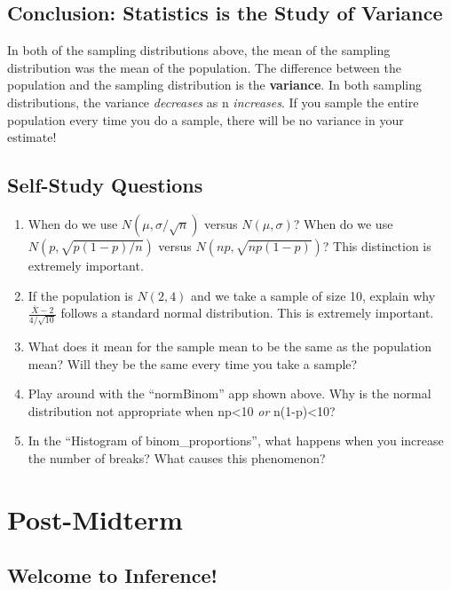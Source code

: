 \documentclass[
  letterpaper,
  DIV=11,
  numbers=noendperiod]{scrreprt}
\providecommand{\tightlist}{%
  \setlength{\itemsep}{0pt}\setlength{\parskip}{0pt}}\usepackage{longtable,booktabs,array}
\begin{document}
\hypertarget{conclusion-statistics-is-the-study-of-variance}{%
\chapter{Conclusion: Statistics is the Study of
Variance}\label{conclusion-statistics-is-the-study-of-variance}}

In both of the sampling distributions above, the mean of the sampling
distribution was the mean of the population. The difference between the
population and the sampling distribution is the \textbf{variance}. In
both sampling distributions, the variance \emph{decreases} as n
\emph{increases}. If you sample the entire population every time you do
a sample, there will be no variance in your estimate!

\hypertarget{self-study-questions-2}{%
\chapter{Self-Study Questions}\label{self-study-questions-2}}

\begin{enumerate}
\def\labelenumi{\arabic{enumi}.}
\tightlist
\item
  When do we use \(N(\mu, \sigma/\sqrt{n})\) versus \(N(\mu, \sigma)\)?
  When do we use \(N(p, \sqrt{p(1-p)/n})\) versus
  \(N(np, \sqrt{np(1-p)})\)? This distinction is extremely important.
\item
  If the population is \(N(2,4)\) and we take a sample of size 10,
  explain why \(\frac{\bar X - 2}{4/\sqrt{10}}\) follows a standard
  normal distribution. This is extremely important.
\item
  What does it mean for the sample mean to be the same as the population
  mean? Will they be the same every time you take a sample?
\item
  Play around with the ``normBinom'' app shown above. Why is the normal
  distribution not appropriate when np\textless10 \emph{or}
  n(1-p)\textless10?
\item
  In the ``Histogram of binom\_proportions'', what happens when you
  increase the number of breaks? What causes this phenomenon?
\end{enumerate}

\part{Post-Midterm}

\hypertarget{welcome-to-inference}{%
\chapter{Welcome to Inference!}\label{welcome-to-inference}}
\end{document}
